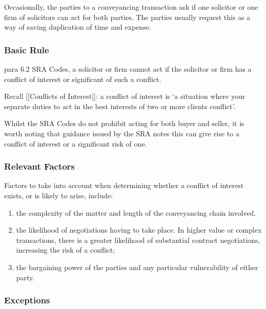 \documentclass[
]{article}
\providecommand{\tightlist}{%
  \setlength{\itemsep}{0pt}\setlength{\parskip}{0pt}}
\begin{document}
Occasionally, the parties to a conveyancing transaction ask if one
solicitor or one firm of solicitors can act for both parties. The
parties usually request this as a way of saving duplication of time and
expense.

\hypertarget{basic-rule-1}{%
\subsubsection{Basic Rule}\label{basic-rule-1}}

para 6.2 SRA Codes, a solicitor or firm cannot act if the solicitor or
firm has a conflict of interest or significant of such a conflict.

Recall {[}{[}Conflicts of Interest{]}{]}: a conflict of interest is `a
situation where your separate duties to act in the best interests of two
or more clients conflict'.

Whilst the SRA Codes do not prohibit acting for both buyer and seller,
it is worth noting that guidance issued by the SRA notes this can give
rise to a conflict of interest or a significant risk of one.

\hypertarget{relevant-factors}{%
\subsubsection{Relevant Factors}\label{relevant-factors}}

Factors to take into account when determining whether a conflict of
interest exists, or is likely to arise, include:

\begin{enumerate}
\def\labelenumi{\arabic{enumi}.}
\tightlist
\item
  the complexity of the matter and length of the conveyancing chain
  involved.
\item
  the likelihood of negotiations having to take place. In higher value
  or complex transactions, there is a greater likelihood of substantial
  contract negotiations, increasing the risk of a conflict;
\item
  the bargaining power of the parties and any particular vulnerability
  of either party.
\end{enumerate}

\hypertarget{exceptions}{%
\subsubsection{Exceptions}\label{exceptions}}
\end{document}
